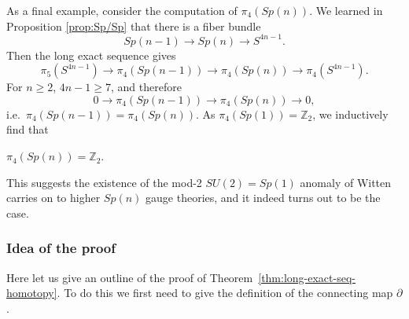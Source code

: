 \documentclass[12pt]{article}
\numberwithin{equation}{section}
\theoremstyle{remark}
\def\bZ{\mathbb{Z}}
\begin{document}
As a final example, consider the computation of $\pi_4(Sp(n))$.
We learned in Proposition \ref{prop:Sp/Sp} that there is a fiber bundle
\begin{equation}
  Sp(n-1)\to Sp(n)\to S^{4n-1}.
\end{equation} Then the long exact sequence gives
\begin{equation}
  \pi_5(S^{4n-1})\to \pi_4(Sp(n-1))\to \pi_4(Sp(n))\to \pi_4(S^{4n-1}).
\end{equation} For $n\ge 2$, $4n-1\ge 7$, and therefore 
\begin{equation}
  0\to \pi_4(Sp(n-1))\to \pi_4(Sp(n))\to 0,
\end{equation} i.e.~$\pi_4(Sp(n-1))=\pi_4(Sp(n))$.
As $\pi_4(Sp(1))=\bZ_2$, we inductively find that 
\begin{example}
  $\pi_4(Sp(n))=\bZ_2$.  
\end{example}
This suggests the existence of the mod-2 $SU(2)=Sp(1)$ anomaly of Witten 
carries on to higher $Sp(n)$ gauge theories,
and it indeed turns out to be the case.


\subsubsection{Idea of the proof}
Here let us give an outline of the proof of Theorem~\ref{thm:long-exact-seq-homotopy}.
To do this we first need to give the definition of the connecting map $\partial$.
\end{document}
